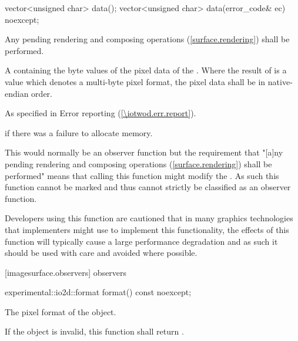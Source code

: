 \begin{itemdecl}
vector<unsigned char> data();
vector<unsigned char> data(error_code& ec) noexcept;
\end{itemdecl}
\begin{itemdescr}
\pnum
\effects
Any pending rendering and composing operations (\ref{surface.rendering}) shall be performed.

\pnum
\returns
A  containing the byte values of the pixel data of the \underlyingimagesurface. Where the result of  is a  value which denotes a multi-byte pixel format, the pixel data shall be in native-endian order.

\pnum
\throws
As specified in Error reporting (\ref{\iotwod.err.report}).

\pnum
\errors
{} if there was a failure to allocate memory.

\pnum
\realnotes
This would normally be an observer function but the requirement that "[a]ny pending rendering and composing operations (\ref{surface.rendering}) shall be performed" means that calling this function might modify the \underlyingimagesurface. As such this function cannot be marked  and thus cannot strictly be classified as an observer function.

\pnum
Developers using this function are cautioned that in many graphics technologies that implementers might use to implement this functionality, the effects of this function will typically cause a large performance degradation and as such it should be used with care and avoided where possible.
\end{itemdescr}

 [imagesurface.observers] { observers}

\begin{itemdecl}
experimental::io2d::format format() const noexcept;
\end{itemdecl}
\begin{itemdescr}
\pnum
\returns
The pixel format of the  object.

\pnum
\remarks
If the  object is invalid, this function shall return .
\end{itemdescr}

